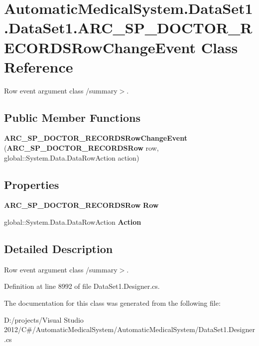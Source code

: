 \section{AutomaticMedicalSystem.DataSet1.DataSet1.ARC\_\-SP\_\-DOCTOR\_\-RECORDSRowChangeEvent Class Reference}
\label{class_automatic_medical_system_1_1_data_set1_1_1_a_r_c___s_p___d_o_c_t_o_r___r_e_c_o_r_d_s_row_change_event}
Row event argument class /summary$>$.  


\subsection*{Public Member Functions}
\begin{CompactItemize}
\item 
\textbf{ARC\_\-SP\_\-DOCTOR\_\-RECORDSRowChangeEvent} ({\bf ARC\_\-SP\_\-DOCTOR\_\-RECORDSRow} row, global::System.Data.DataRowAction action)\label{class_automatic_medical_system_1_1_data_set1_1_1_a_r_c___s_p___d_o_c_t_o_r___r_e_c_o_r_d_s_row_change_event_6c250972728ef86685b1dbc0551da2ef}

\end{CompactItemize}
\subsection*{Properties}
\begin{CompactItemize}
\item 
{\bf ARC\_\-SP\_\-DOCTOR\_\-RECORDSRow} \textbf{Row}\hspace{0.3cm}{\tt  [get]}\label{class_automatic_medical_system_1_1_data_set1_1_1_a_r_c___s_p___d_o_c_t_o_r___r_e_c_o_r_d_s_row_change_event_e859e380d589d9a66b804ab795b30293}

\item 
global::System.Data.DataRowAction \textbf{Action}\hspace{0.3cm}{\tt  [get]}\label{class_automatic_medical_system_1_1_data_set1_1_1_a_r_c___s_p___d_o_c_t_o_r___r_e_c_o_r_d_s_row_change_event_390e427110a351cf8a833bb1d0028035}

\end{CompactItemize}


\subsection{Detailed Description}
Row event argument class /summary$>$. 

Definition at line 8992 of file DataSet1.Designer.cs.

The documentation for this class was generated from the following file:\begin{CompactItemize}
\item 
D:/projects/Visual Studio 2012/C\#/AutomaticMedicalSystem/AutomaticMedicalSystem/DataSet1.Designer.cs\end{CompactItemize}
